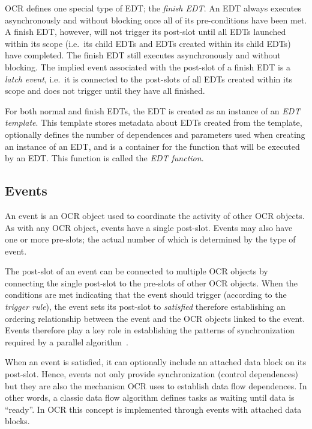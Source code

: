 OCR defines one special type of EDT; the \emph{finish
EDT}. An EDT always executes asynchronously and
without blocking once all of its pre-conditions have been met. A
finish EDT, however, will not trigger its post-slot until all EDTs
launched within its scope (i.e.\ its child EDTs and EDTs created
within its child EDTs) have completed.  The finish EDT still executes
asynchronously and without blocking. The implied event associated with
the post-slot of a finish EDT is a \emph{latch event}, i.e.\ it is
connected to the post-slots of all EDTs created within its scope and
does not trigger until they have all finished.

For both normal and finish EDTs, the EDT is created as an
instance of  an \emph{EDT template}. This template stores metadata about EDTs created from the
template, optionally defines the number of dependences and parameters
used when creating an instance of an EDT, and is a container for the
function that will be executed by an EDT. This function is called the
\emph{EDT function}.

\subsection{Events}
\label{sec:Event}

An event is an OCR object used to coordinate the activity of other OCR
objects. As with any OCR object, events have a single
post-slot. Events may also have one or more pre-slots; the actual
number of which is determined by the type of event.

The post-slot of an event can be connected to multiple OCR objects by
connecting the single post-slot to the pre-slots of other OCR objects.
When the conditions are met indicating that the event should trigger
(according to the \emph{trigger rule}), the event
sets its post-slot to \emph{satisfied} therefore establishing an
ordering relationship between the event and the OCR objects linked to
the event. Events therefore play a key role in establishing the
patterns of synchronization required by a parallel
algorithm~\cite{ImSa14-2}.

When an event is satisfied, it can optionally include an attached data block on its
post-slot. Hence, events not only provide synchronization
(control dependences) but they are also the mechanism OCR uses to
establish data flow dependences. In other words, a classic data flow
algorithm defines tasks as waiting until data is ``ready''. In OCR
this concept is implemented through events with attached data blocks.

